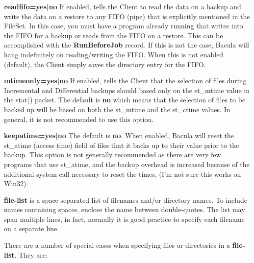 \begin{description}
\begin{description}
\item {\bf readfifo=yes|no}
If enabled, tells the Client to  read the data on a backup and write the data
on a restore  to any FIFO (pipe) that is explicitly mentioned  in the FileSet.
In this case, you must have a program already  running that writes into the
FIFO for a backup or reads  from the FIFO on a restore. This can be
accomplished with  the {\bf RunBeforeJob} record. If this is not the case, 
Bacula will hang indefinitely on reading/writing the FIFO.  When this is not
enabled (default), the Client simply  saves the directory entry for the FIFO. 

\item {\bf mtimeonly=yes|no}
If enabled, tells the Client that  the selection of files during Incremental
and Differential  backups should based only on the st\_mtime value in the
stat()  packet. The default is {\bf no} which means that the  selection of
files to be backed up will be based on both the  st\_mtime and the st\_ctime
values. In general, it is not  recommended to use this option. 

\item {\bf keepatime=yes|no}
The default is {\bf no}. When  enabled, Bacula will reset the st\_atime
(access time) field  of files that it backs up to their value prior to the 
backup. This option is not generally recommended as there  are very few
programs that use st\_atime, and the backup  overhead is increased because of
the additional system  call necessary to reset the times. (I'm not sure this 
works on Win32). 
\end{description}

{\bf \lt{}file-list\gt{}} is a space separated list of filenames and/or
directory names. To include names containing spaces, enclose the name between
double-quotes. The list may span multiple lines, in fact, normally it is good
practice to specify each filename on a separate line. 

There are a number of special cases when specifying files or directories in a
{\bf file-list}. They are: 


\end{description}
